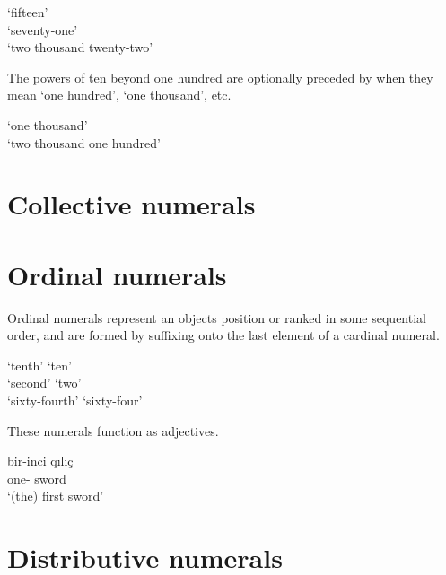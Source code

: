 \begin{lingexample}
	\ex {} `fifteen' \\
		 `seventy-one' \\
		 `two thousand twenty-two'
\end{lingexample}

The powers of ten beyond one hundred are optionally preceded by  when they mean `one hundred', `one thousand', etc.

\begin{lingexample}
	\ex {} `one thousand' \\
		 `two thousand one hundred'
\end{lingexample}

\section{Collective numerals}

\section{Ordinal numerals}

Ordinal numerals represent an object\apostrophe{}s position or ranked in some sequential order, and are formed by suffixing  onto the last element of a cardinal numeral.

\begin{lingexample}
	\ex {} `tenth' \derivedfrom{}  `ten' \\
		 `second' \derivedfrom{}  `two' \\
		 `sixty-fourth' \derivedfrom{}  `sixty-four'
\end{lingexample}

These numerals function as adjectives.

\begin{lingexample}
	\ex \gll bir-inci qılıç \\
		one-\Ord{} sword \\
		\glt `(the) first sword'
\end{lingexample}

\section{Distributive numerals}

